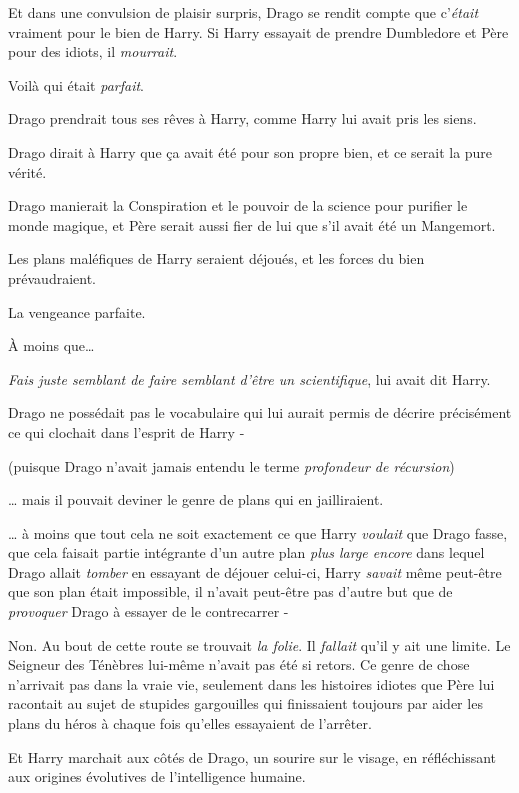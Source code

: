 Et dans une convulsion de plaisir surpris, Drago se rendit compte que c'\emph{était} vraiment pour le bien de Harry. Si Harry essayait de prendre Dumbledore et Père pour des idiots, il \emph{mourrait}.

Voilà qui était \emph{parfait}.

Drago prendrait tous ses rêves à Harry, comme Harry lui avait pris les siens.

Drago dirait à Harry que ça avait été pour son propre bien, et ce serait la pure vérité.

Drago manierait la Conspiration et le pouvoir de la science pour purifier le monde magique, et Père serait aussi fier de lui que s'il avait été un Mangemort.

Les plans maléfiques de Harry seraient déjoués, et les forces du bien prévaudraient.

La vengeance parfaite.

À moins que…

\emph{Fais juste semblant de faire semblant d'être un scientifique}, lui avait dit Harry.

Drago ne possédait pas le vocabulaire qui lui aurait permis de décrire précisément ce qui clochait dans l'esprit de Harry -

(puisque Drago n'avait jamais entendu le terme \emph{profondeur de récursion})

… mais il pouvait deviner le genre de plans qui en jailliraient.

… à moins que tout cela ne soit exactement ce que Harry \emph{voulait} que Drago fasse, que cela faisait partie intégrante d'un autre plan \emph{plus large encore} dans lequel Drago allait \emph{tomber} en essayant de déjouer celui-ci, Harry \emph{savait} même peut-être que son plan était impossible, il n'avait peut-être pas d'autre but que de \emph{provoquer} Drago à essayer de le contrecarrer -

Non. Au bout de cette route se trouvait \emph{la folie}. Il \emph{fallait} qu'il y ait une limite. Le Seigneur des Ténèbres lui-même n'avait pas été si retors. Ce genre de chose n'arrivait pas dans la vraie vie, seulement dans les histoires idiotes que Père lui racontait au sujet de stupides gargouilles qui finissaient toujours par aider les plans du héros à chaque fois qu'elles essayaient de l'arrêter.

\later

Et Harry marchait aux côtés de Drago, un sourire sur le visage, en réfléchissant aux origines évolutives de l'intelligence humaine.

